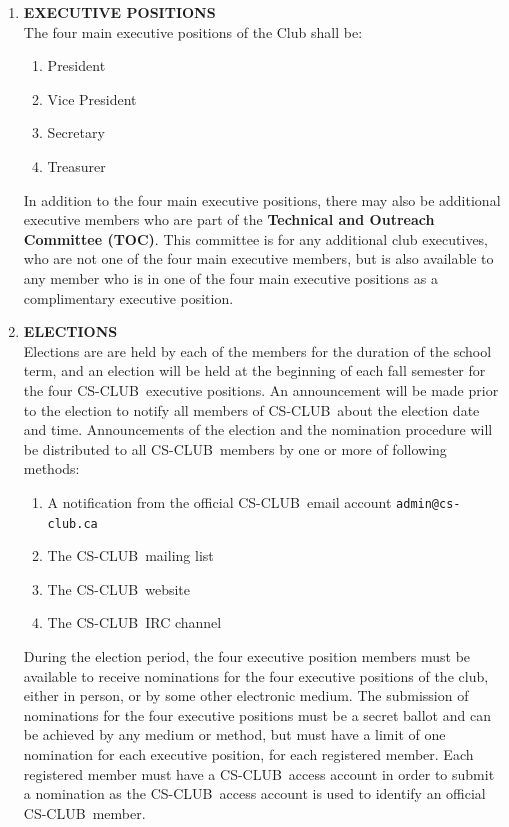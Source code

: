 \documentclass{article}
\providecommand{\csclub}{{\scshape CS-CLUB~}}
\begin{document}
\begin{enumerate}
\item{\bf EXECUTIVE POSITIONS}\\[0.6em]
	The four main executive positions of the Club shall be:
	\begin{enumerate}
		\item President
		\item Vice President
		\item Secretary
		\item Treasurer
	\end{enumerate}
	
In addition to the four main executive positions, there may also be additional executive members who are part of the {\bf Technical and Outreach Committee (TOC)}. This committee is for any additional club executives, who are not one of the four main executive members, but is also available to any member who is in one of the four main executive positions as a complimentary executive position.


\item{\bf ELECTIONS}\\[0.6em]
Elections are are held by each of the members for the duration of the school term, and an election will be held at the beginning of each fall semester for the four \csclub executive positions. An announcement will be made prior to the election to notify all members of \csclub about the election date and time. Announcements of the election and the nomination procedure will be distributed to all \csclub members by one or more of following methods:

	\begin{enumerate}
		\item A notification from the official \csclub email account \verb|admin@cs-club.ca|
		\item The \csclub mailing list
		\item The \csclub website
		\item The \csclub IRC channel
	\end{enumerate}

During the election period, the four executive position members must be available to receive nominations for the four executive positions of the club, either in person, or by some other electronic medium. The submission of nominations for the four executive  positions must be a secret ballot and can be achieved by any medium or method, but must have a limit of one nomination for each executive position, for each registered member. Each registered member must have a \csclub access account in order to submit a nomination as the \csclub access account is used to identify an official \csclub member.


\end{enumerate}
\end{document}
